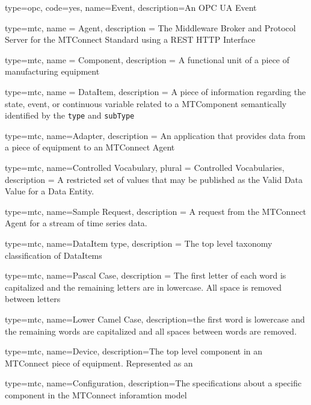{
  type=opc,
  code=yes,
  name=Event,
  description={An OPC UA Event}
}



{
  type=mtc,
  name = {Agent},
  description = {The Middleware Broker and Protocol Server for the MTConnect Standard using a REST HTTP Interface}
}

{
  type=mtc,
  name = Component,
  description = {A functional unit of a piece of manufacturing equipment}
}

{
  type=mtc,
  name = DataItem,
  description = {A piece of information regarding the state, event, or continuous variable related to a \gls{MTComponent} semantically identified by the \texttt{type} and \texttt{subType}}
}

{
  type=mtc,
  name=Adapter,
  description = {An application that provides data from a piece of equipment to an MTConnect Agent}
}

{
  type=mtc,
  name={Controlled Vocabulary},
  plural = {Controlled Vocabularies},
  description = {A restricted set of values that may be published as the Valid Data Value for a Data Entity.}
}

{
  type=mtc,
  name={Sample Request},
  description = {A request from the MTConnect \gls{Agent} for a stream of time series data.}
}

{
  type=mtc,
  name={DataItem type},
  description = {The top level taxonomy classification of \glspl{DataItem}}
}

{
  type=mtc,
  name={Pascal Case},
  description = {The first letter of each word is capitalized and the remaining letters are in lowercase. All space is removed between letters}
}

{
  type=mtc,
  name={Lower Camel Case},
  description={the first word is lowercase and the remaining words are capitalized and all spaces between words are removed.}
}


{
  type=mtc,
  name=Device,
  description={The top level component in an MTConnect piece of equipment. Represented as an }
}

{
  type=mtc,
  name=Configuration,
  description={The specifications about a specific component in the MTConnect inforamtion model}
}

